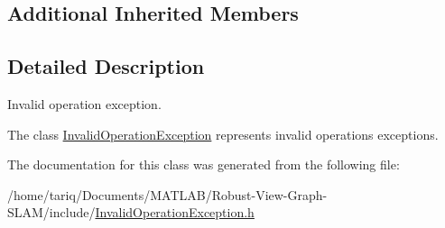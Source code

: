 \subsection*{Additional Inherited Members}


\subsection{Detailed Description}
Invalid operation exception. 

The class \hyperlink{classInvalidOperationException}{Invalid\+Operation\+Exception} represents invalid operations exceptions. 

The documentation for this class was generated from the following file\+:\begin{DoxyCompactItemize}
\item 
/home/tariq/\+Documents/\+M\+A\+T\+L\+A\+B/\+Robust-\/\+View-\/\+Graph-\/\+S\+L\+A\+M/include/\hyperlink{InvalidOperationException_8h}{Invalid\+Operation\+Exception.\+h}\end{DoxyCompactItemize}
